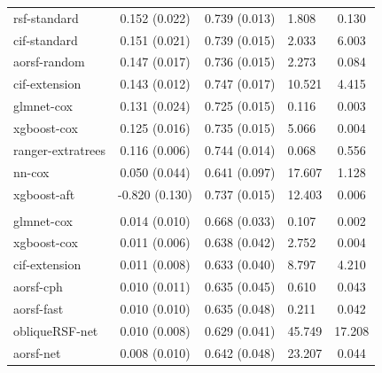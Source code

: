 \documentclass[twoside,11pt]{article}\usepackage[]{graphicx}\usepackage[]{xcolor}
\newenvironment{knitrout}{}{} %
\begin{document}
\begin{knitrout}
\begin{longtable}[t]{lcclc}
\hspace{1em}rsf-standard & 0.152 (0.022) & 0.739 (0.013) & 1.808 & 0.130\\
\hspace{1em}cif-standard & 0.151 (0.021) & 0.739 (0.015) & 2.033 & 6.003\\
\hspace{1em}aorsf-random & 0.147 (0.017) & 0.736 (0.015) & 2.273 & 0.084\\
\hspace{1em}cif-extension & 0.143 (0.012) & 0.747 (0.017) & 10.521 & 4.415\\
\hspace{1em}glmnet-cox & 0.131 (0.024) & 0.725 (0.015) & 0.116 & 0.003\\
\hspace{1em}xgboost-cox & 0.125 (0.016) & 0.735 (0.015) & 5.066 & 0.004\\
\hspace{1em}ranger-extratrees & 0.116 (0.006) & 0.744 (0.014) & 0.068 & 0.556\\
\hspace{1em}nn-cox & 0.050 (0.044) & 0.641 (0.097) & 17.607 & 1.128\\
\hspace{1em}xgboost-aft & -0.820 (0.130) & 0.737 (0.015) & 12.403 & 0.006\\
\addlinespace[0.3em]
\hline
\multicolumn{5}{l}{\textit{\textbf{Monoclonal gammopathy; malignancy, n = 1384, p = 8}}}\\
\hline
\hspace{1em}glmnet-cox & 0.014 (0.010) & 0.668 (0.033) & 0.107 & 0.002\\
\hspace{1em}xgboost-cox & 0.011 (0.006) & 0.638 (0.042) & 2.752 & 0.004\\
\hspace{1em}cif-extension & 0.011 (0.008) & 0.633 (0.040) & 8.797 & 4.210\\
\hspace{1em}aorsf-cph & 0.010 (0.011) & 0.635 (0.045) & 0.610 & 0.043\\
\hspace{1em}aorsf-fast & 0.010 (0.010) & 0.635 (0.048) & 0.211 & 0.042\\
\hspace{1em}obliqueRSF-net & 0.010 (0.008) & 0.629 (0.041) & 45.749 & 17.208\\
\hspace{1em}aorsf-net & 0.008 (0.010) & 0.642 (0.048) & 23.207 & 0.044\\

\end{longtable}
\end{knitrout}
\end{document}
